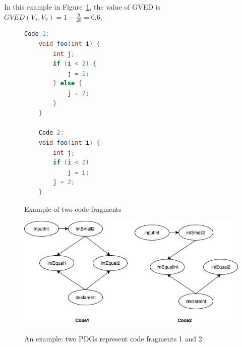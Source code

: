 In this example in Figure~\ref{code1code2}, the value of GVED is
$GVED\left(V_1, V_2\right) = 1 - \frac{8 }{20} = 0.6 $,

\begin{figure}
\begin{lstlisting}[language=JAVA]
	Code 1:
	void foo(int i) {
		int j;
		if (i < 2) {
			j = 1;
		} else {
			j = 2;
		}
	}

	Code 2:
	void foo(int i) {
		int j;
		if (i < 2)
			j = i;	
		j = 2;
	}
\end{lstlisting}
\caption{Example of two code fragments}
\label{code1code2}
\end{figure}

\begin{figure}[t]
	\caption{An example: two PDGs represent code fragments 1 and 2}
	\includegraphics[scale=0.4]{img/Diagram_PDG.png}
	\centering
	\label{fig:PDGs}
\end{figure}

\begin{table}[t]
  \centering
  \caption{Feature Table of Code Fragment 1 in Exas}
  \label{tab:feature1}%
\end{table}%

